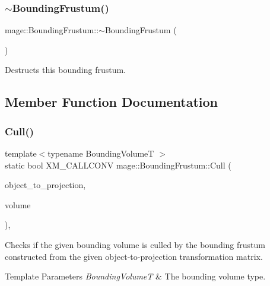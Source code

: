 \subsubsection{\texorpdfstring{$\sim$\+Bounding\+Frustum()}{~BoundingFrustum()}}
{\footnotesize\ttfamily mage\+::\+Bounding\+Frustum\+::$\sim$\+Bounding\+Frustum (\begin{DoxyParamCaption}{ }\end{DoxyParamCaption})\hspace{0.3cm}{\ttfamily [default]}}

Destructs this bounding frustum. 

\subsection{Member Function Documentation}
\hypertarget{classmage_1_1_bounding_frustum_af2080fda86e99ae8dda866b7a90f84a1}{}\label{classmage_1_1_bounding_frustum_af2080fda86e99ae8dda866b7a90f84a1} 
\subsubsection{\texorpdfstring{Cull()}{Cull()}}
{\footnotesize\ttfamily template$<$typename Bounding\+VolumeT $>$ \\
static bool X\+M\+\_\+\+C\+A\+L\+L\+C\+O\+NV mage\+::\+Bounding\+Frustum\+::\+Cull (\begin{DoxyParamCaption}\item[{F\+X\+M\+M\+A\+T\+R\+IX}]{object\+\_\+to\+\_\+projection,  }\item[{const Bounding\+VolumeT \&}]{volume }\end{DoxyParamCaption})\hspace{0.3cm}{\ttfamily [static]}, {\ttfamily [noexcept]}}

Checks if the given bounding volume is culled by the bounding frustum constructed from the given object-\/to-\/projection transformation matrix.


\begin{DoxyTemplParams}{Template Parameters}
{\em Bounding\+VolumeT} & The bounding volume type. \\
\hline
\end{DoxyTemplParams}

